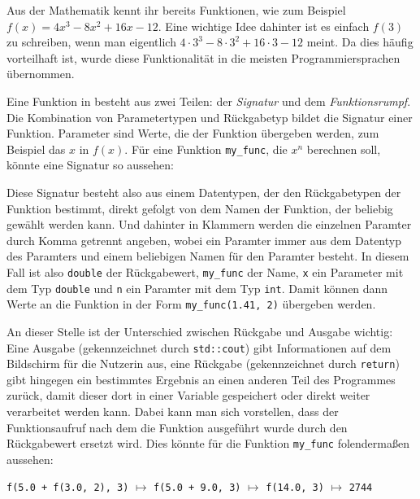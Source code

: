 
Aus der Mathematik kennt ihr bereits Funktionen, wie zum Beispiel $f(x) = 4x^3 - 8x^2 + 16x - 12$.
Eine wichtige Idee dahinter ist es einfach $f(3)$ zu schreiben, wenn man eigentlich $4 \cdot 3^3 - 8 \cdot 3^2 + 16 \cdot 3 - 12$ meint.
Da dies häufig vorteilhaft ist, wurde diese Funktionalität in die meisten Programmiersprachen übernommen.

Eine Funktion in \Cpp besteht aus zwei Teilen: der \emph{Signatur} und dem \emph{Funktionsrumpf}.
Die Kombination von Parametertypen und Rückgabetyp bildet die Signatur einer Funktion.
Parameter sind Werte, die der Funktion übergeben werden, zum Beispiel das $x$ in $f(x)$.
Für eine Funktion \texttt{my\_func}, die  $x^n$ berechnen soll, könnte eine Signatur so aussehen:

\begin{center}
\end{center}


Diese Signatur besteht also aus einem Datentypen, der den Rückgabetypen der Funktion bestimmt, direkt gefolgt von dem Namen der Funktion, der beliebig gewählt werden kann.
Und dahinter in Klammern werden die einzelnen Paramter durch Komma getrennt angeben, wobei ein Paramter immer aus dem Datentyp des Paramters und einem beliebigen Namen für den Paramter besteht.
In diesem Fall ist also \texttt{double} der Rückgabewert, \texttt{my\_func} der Name, \texttt{x} ein Parameter mit dem Typ \texttt{double} und \texttt{n} ein Paramter mit dem Typ \texttt{int}.
Damit können dann Werte an die Funktion in der Form \texttt{my\_func(1.41, 2)} übergeben werden.

An dieser Stelle ist der Unterschied zwischen Rückgabe und Ausgabe wichtig: Eine Ausgabe (gekennzeichnet durch \texttt{std::cout}) gibt Informationen auf dem Bildschirm für die Nutzerin aus, eine Rückgabe (gekennzeichnet durch \texttt{return}) gibt hingegen ein bestimmtes Ergebnis an einen anderen Teil des Programmes zurück, damit dieser dort in einer Variable gespeichert oder direkt weiter verarbeitet werden kann.
Dabei kann man sich vorstellen, dass der Funktionsaufruf nach dem die Funktion ausgeführt wurde durch den Rückgabewert ersetzt wird.
Dies könnte für die Funktion \texttt{my\_func} folendermaßen aussehen:

\begin{center}
	\texttt{f(5.0 + f(3.0, 2), 3)} $\mapsto$ \texttt{f(5.0 + 9.0, 3)} $\mapsto$ \texttt{f(14.0, 3)} $\mapsto$ \texttt{2744}
\end{center}



